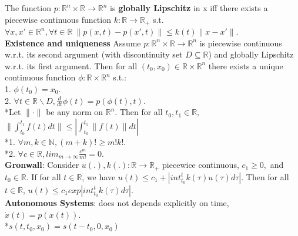 \documentclass[10pt,landscape]{article}
\begin{document}
\begin{multicols*}{4}
The function $p: \mathbb{R}^n \times \mathbb{R} \rightarrow \mathbb{R}^n$ is \textbf{globally Lipschitz} in x iff there exists a piecewise continuous function $k: \mathbb{R} \rightarrow \mathbb{R}_+$ s.t.\\
$\forall x,x' \in \mathbb{R}^n, \forall t\in\mathbb{R}\ \parallel p(x,t)-p(x',t) \parallel \leq k(t)\parallel x - x' \parallel$.\\

\textbf{Existence and uniqueness} Assume $p: \mathbb{R}^n \times \mathbb{R} \rightarrow \mathbb{R}^n$ is piecewise continuous w.r.t. its second argument (with discontinuity set $D \subseteq \mathbb{R}$) and globally Lipschitz w.r.t. its first argument. Then for all $(t_0,x_0) \in \mathbb{R} \times \mathbb{R}^n$ there exists a unique continuous function $\phi: \mathbb{R} \times \mathbb{R}^n$ s.t.:\\
1. $\phi(t_0) = x_0$.\\
2. $\forall t \in \mathbb{R} \backslash D, \frac{d}{dt} \phi(t) = p(\phi(t),t)  $.\\ 

*Let $\parallel \cdot \parallel$ be any norm on $\mathbb{R}^n$. Then for all $t_0,t_1 \in \mathbb{R},$\\
$\parallel \int_{t_0}^{t_1} f(t) dt \parallel \leq | \int_{t_0}^{t_1} \parallel f(t) \parallel dt |$\\
*1. $\forall m,k \in \mathbb{N}, (m+k)! \geq m!k!.$\\
*2. $\forall c \in \mathbb{R}, lim_{m \rightarrow \infty} \frac{c^m}{m!}=0.$\\
\textbf{Gronwall}: Consider $u(.),k(.): \mathbb{R} \rightarrow \mathbb{R}_+$ piecewice continuous, $c_1 \geq 0,$ and $t_0 \in \mathbb{R}$. If for all $t \in \mathbb{R}$, we have $u(t) \leq c_1 + |int_{t_0}^{t}k(\tau)u(\tau) d\tau|$. Then for all $t \in \mathbb{R}$, $u(t) \leq c_1exp|int_{t_0}^{t}k(\tau) d\tau|$.\\
\textbf{Autonomous Systems}: does not depends explicitly on time, $\dot{x}(t) = p(x(t))$.\\
*$s(t,t_0,x_0) = s(t-t_0,0,x_0)$


\newpage

\end{multicols*}
\end{document}

